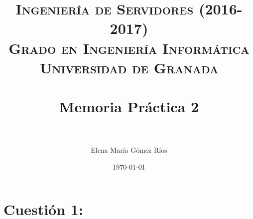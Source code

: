 


\title{	
\normalfont \normalsize 
\textsc{\textbf{Ingeniería de Servidores (2016-2017)} \\ Grado en Ingeniería Informática \\ Universidad de Granada} \\ [25pt] %
\horrule{0.5pt} \\[0.4cm] %
\huge Memoria Práctica 2 \\ %
\horrule{2pt} \\[0.5cm] %
}

\author{Elena María Gómez Ríos} %

\date{\normalsize\today} %




\maketitle %

\newpage %

\tableofcontents %

\listoffigures

\listoftables

\newpage

 


\newpage


\section{Cuestión 1:}

